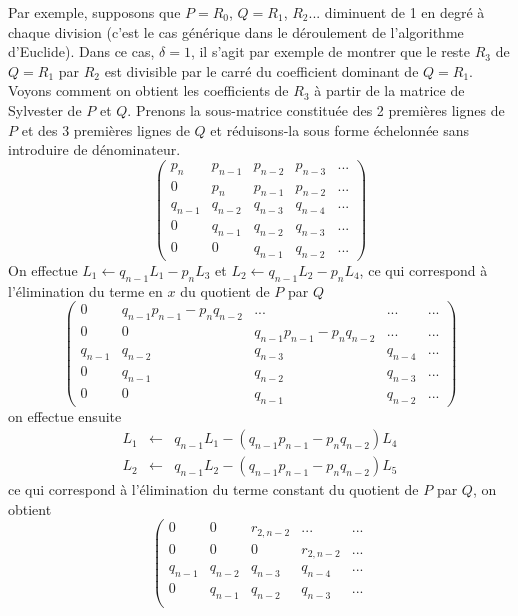 \documentclass[a4paper,11pt]{article}
\begin{document}
\begin{giacjshere}
Par exemple, supposons que $P=R_0$, $Q=R_1$, $R_2$... diminuent de 1 en degr\'e
\`a chaque division 
(c'est le cas g\'en\'erique dans le d\'eroulement de l'algorithme
d'Euclide). Dans ce cas, $\delta=1$, il s'agit par exemple
de montrer que le reste $R_3$ de $Q=R_1$ par $R_2$ est divisible par le
carr\'e du coefficient dominant de $Q=R_1$.
Voyons comment on obtient les coefficients de $R_3$
\`a partir de la matrice de Sylvester de $P$ et $Q$. 
Prenons la sous-matrice constitu\'ee des 2 premi\`eres lignes de $P$
et des 3 premi\`eres lignes de $Q$ et r\'eduisons-la sous forme
\'echelonn\'ee sans introduire de d\'enominateur. 
\[
\left( \begin{array}{ccccc}
p_n & p_{n-1} & p_{n-2} & p_{n-3} & ... \\
0 & p_n & p_{n-1} & p_{n-2} &  ... \\
q_{n-1} & q_{n-2} & q_{n-3} & q_{n-4} & ... \\
0 & q_{n-1} & q_{n-2} & q_{n-3} & ... \\
0 & 0 & q_{n-1} & q_{n-2} &  ...  
\end{array} 
\right)
\]
On effectue $L_1 \leftarrow q_{n-1} L_1 - p_n L_3$
et $L_2 \leftarrow q_{n-1} L_2 - p_n L_4$, ce qui correspond \`a
l'\'elimination du terme en $x$ du quotient de $P$ par $Q$
\[
\left( \begin{array}{ccccc}
0 & q_{n-1} p_{n-1} - p_n q_{n-2}  & ... & ... & ... \\
0 & 0 & q_{n-1} p_{n-1} - p_n q_{n-2} & ... &  ... \\
q_{n-1} & q_{n-2} & q_{n-3} & q_{n-4} & ... \\
0 & q_{n-1} & q_{n-2} & q_{n-3} & ... \\
0 & 0 & q_{n-1} & q_{n-2} &  ...  
\end{array} 
\right)
\]
on effectue ensuite 
\begin{eqnarray*}
L_1 & \leftarrow &q_{n-1} L_1 - (q_{n-1} p_{n-1} - p_n q_{n-2})  L_4 \\
L_2 & \leftarrow & q_{n-1} L_2 - (q_{n-1} p_{n-1} - p_n q_{n-2})  L_5
\end{eqnarray*} 
ce qui correspond \`a l'\'elimination du terme constant du quotient
de $P$ par $Q$, on obtient
\[
\left( \begin{array}{ccccc}
0 & 0 & r_{2,n-2} & ... & ... \\
0 & 0 & 0 & r_{2,n-2} &  ... \\
q_{n-1} & q_{n-2} & q_{n-3} & q_{n-4} & ... \\
0 & q_{n-1} & q_{n-2} & q_{n-3} & ... \\

\end{array}\]
\end{giacjshere}
\end{document}
